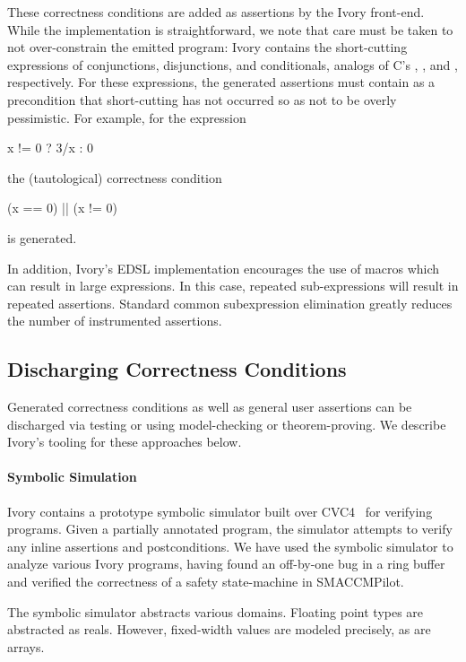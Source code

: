 These correctness conditions are added as assertions by the Ivory
front-end.  While the implementation is straightforward, we note that
care must be taken to not over-constrain the emitted program: 
 Ivory contains
the short-cutting expressions of conjunctions, disjunctions, and conditionals,
analogs of C's \cd{\&\&}, \cd{||}, and , respectively. For these
expressions, the generated assertions must contain as a precondition that
short-cutting has not occurred so as not to be overly pessimistic. For example,
for the expression
\noindent
\begin{code}
x != 0 ? 3/x : 0
\end{code}
\noindent
the (tautological) correctness condition
\begin{code}
(x == 0) || (x != 0)
\end{code}
\noindent
is generated.


In addition, Ivory's EDSL implementation encourages the use of macros
which can result in large expressions. In this case, repeated
sub-expressions will result in repeated assertions.  Standard common
subexpression elimination greatly reduces the number of
instrumented assertions.

\subsection{Discharging Correctness Conditions}

Generated correctness conditions as well as general user assertions can be
discharged via testing or using model-checking or theorem-proving. We describe
Ivory's tooling for these approaches below.

\paragraph{Symbolic Simulation}

Ivory contains a prototype symbolic simulator built over
CVC4~\cite{cvc4} for verifying programs.  Given a partially annotated
program, the simulator attempts to verify any inline assertions and
postconditions.  We have used the symbolic simulator to analyze
various Ivory programs, having found an off-by-one bug in a ring
buffer and verified the correctness of a safety state-machine in
SMACCMPilot.

The symbolic simulator abstracts various domains. Floating point types
are abstracted as reals. However, fixed-width values are modeled
precisely, as are arrays.

